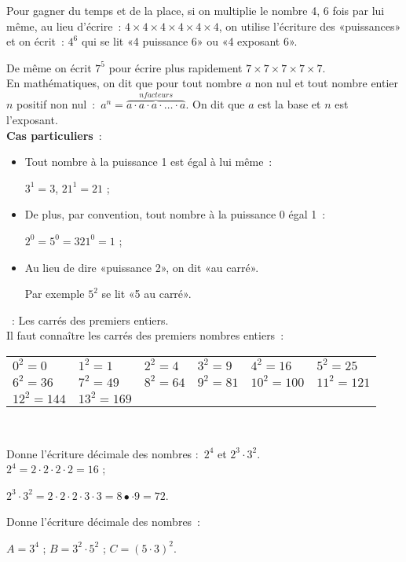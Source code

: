\begin{methode*1}

\begin{aconnaitre}
Pour gagner du temps et de la place, si on multiplie le nombre 4, 6 fois par lui même, au lieu d'écrire : $4 \times 4 \times 4 \times 4 \times 4 \times 4$, on utilise l'écriture des «puissances» et on écrit : $4^6$ qui se lit «4 puissance 6» ou «4 exposant 6».

De même on écrit $7^5$ pour écrire plus rapidement $7 \times 7 \times 7 \times 7 \times 7$. \\[1em]
En mathématiques, on dit que pour tout nombre $a$ non nul et tout nombre entier $n$ positif non nul : $a^n = \stackrel{n facteurs}{\overbrace{a \cdot a \cdot a \cdot \ldots \cdot a}}$. On dit que $a$ est la base et $n$ est l'exposant. \\[1em]
\textbf{Cas particuliers} : 
\begin{itemize}
 \item Tout nombre à la puissance 1 est égal à lui même : 
 
 $3^1 = 3$, $21^1 = 21$ ;
 \item De plus, par convention, tout nombre à la puissance 0 égal 1 : 
 
 $2^0 = 5^0 = 321^0 = 1$ ;
 \item Au lieu de dire «puissance 2», on dit «au carré». 
 
 Par exemple $5^2$ se lit «5 au carré».
 \end{itemize}
\end{aconnaitre}

\begin{exemple*1}
 : Les carrés des premiers entiers. \\[1em]
Il faut connaître les carrés des premiers nombres entiers : 

\begin{tabularx}{0.7\textwidth}{llllll}
$0^2 = 0$	& $1^2 = 1$ & $2^2 = 4$ & $3^2 = 9$ & $4^2 = 16$ & $5^2 = 25$ \\
$6^2 = 36$ & $7^2 = 49$ & $8^2 = 64$ & $9^2 = 81$ & $10^2 = 100$ & $11^2 = 121$ \\ 
$12^2 = 144$ & $13^2 = 169$ & & & & \\
 \end{tabularx} \\
 \end{exemple*1}

\begin{exemple*1}
Donne l'écriture décimale des nombres : $2^4$ et $2^3 \cdot 3^2$. \\[1em]
$2^4 =  2 \cdot 2 \cdot 2 \cdot 2 = 16$ ;

$2^3 \cdot 3^2 = 2 \cdot 2 \cdot 2 \cdot 3 \cdot 3 = 8 •\cdot 9 = 72$.
 \end{exemple*1}

\exercice  
Donne l'écriture décimale des nombres : 

$A = 3^4$ ; $B = 3^2 \cdot 5^2$ ; $C = (5 \cdot 3)^2$.

\dotfill

\dotfill

 \end{methode*1}
 

